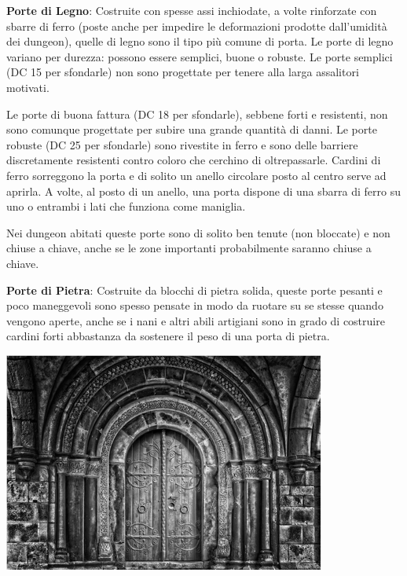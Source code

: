 \begin{multicols}{2}

\medskip

\textbf{Porte di Legno}: Costruite con spesse assi inchiodate, a volte rinforzate con sbarre di ferro (poste anche per impedire le deformazioni prodotte dall'umidità dei dungeon), quelle di legno sono il tipo più comune di porta. Le porte di legno variano per durezza: possono essere semplici, buone o robuste. Le porte semplici (DC 15 per sfondarle) non sono progettate per tenere alla larga assalitori motivati.

Le porte di buona fattura (DC 18 per sfondarle), sebbene forti e resistenti, non sono comunque progettate per subire una grande quantità di danni. Le porte robuste (DC 25 per sfondarle) sono rivestite in ferro e sono delle barriere discretamente resistenti contro coloro che cerchino di oltrepassarle. Cardini di ferro sorreggono la porta e di solito un anello circolare posto al centro serve ad aprirla. A volte, al posto di un anello, una porta dispone di una sbarra di ferro su uno o entrambi i lati che funziona come maniglia.

Nei dungeon abitati queste porte sono di solito ben tenute (non bloccate) e non chiuse a chiave, anche se le zone importanti probabilmente saranno chiuse a chiave.

\textbf{Porte di Pietra}: Costruite da blocchi di pietra solida, queste porte pesanti e poco maneggevoli sono spesso pensate in modo da ruotare su se stesse quando vengono aperte, anche se i nani e altri abili artigiani sono in grado di costruire cardini forti abbastanza da sostenere il peso di una porta di pietra.


\begin{center}
	\includegraphics[width=0.9\linewidth]{immagini/porta_grey.png}
\end{center}



\end{multicols}
